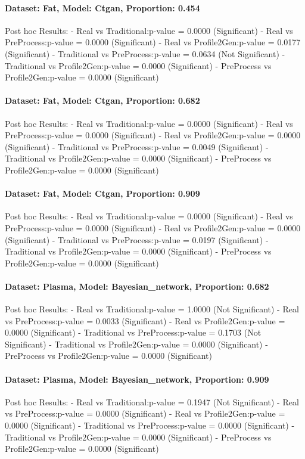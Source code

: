 \documentclass{article}
\theoremstyle{plain}
\theoremstyle{definition}
\theoremstyle{remark}
\begin{document}
\paragraph{Dataset: Fat, Model: Ctgan, Proportion: 0.454
}Post hoc Results:
- Real vs Traditional:p-value = 0.0000 (Significant)
- Real vs PreProcess:p-value = 0.0000 (Significant)
- Real vs Profile2Gen:p-value = 0.0177 (Significant)
- Traditional vs PreProcess:p-value = 0.0634 (Not Significant)
- Traditional vs Profile2Gen:p-value = 0.0000 (Significant)
- PreProcess vs Profile2Gen:p-value = 0.0000 (Significant)

\paragraph{Dataset: Fat, Model: Ctgan, Proportion: 0.682
}Post hoc Results:
- Real vs Traditional:p-value = 0.0000 (Significant)
- Real vs PreProcess:p-value = 0.0000 (Significant)
- Real vs Profile2Gen:p-value = 0.0000 (Significant)
- Traditional vs PreProcess:p-value = 0.0049 (Significant)
- Traditional vs Profile2Gen:p-value = 0.0000 (Significant)
- PreProcess vs Profile2Gen:p-value = 0.0000 (Significant)

\paragraph{Dataset: Fat, Model: Ctgan, Proportion: 0.909
}Post hoc Results:
- Real vs Traditional:p-value = 0.0000 (Significant)
- Real vs PreProcess:p-value = 0.0000 (Significant)
- Real vs Profile2Gen:p-value = 0.0000 (Significant)
- Traditional vs PreProcess:p-value = 0.0197 (Significant)
- Traditional vs Profile2Gen:p-value = 0.0000 (Significant)
- PreProcess vs Profile2Gen:p-value = 0.0000 (Significant)

\paragraph{Dataset: Plasma, Model: Bayesian\_network, Proportion: 0.682
}Post hoc Results:
- Real vs Traditional:p-value = 1.0000 (Not Significant)
- Real vs PreProcess:p-value = 0.0033 (Significant)
- Real vs Profile2Gen:p-value = 0.0000 (Significant)
- Traditional vs PreProcess:p-value = 0.1703 (Not Significant)
- Traditional vs Profile2Gen:p-value = 0.0000 (Significant)
- PreProcess vs Profile2Gen:p-value = 0.0000 (Significant)

\paragraph{Dataset: Plasma, Model: Bayesian\_network, Proportion: 0.909
}Post hoc Results:
- Real vs Traditional:p-value = 0.1947 (Not Significant)
- Real vs PreProcess:p-value = 0.0000 (Significant)
- Real vs Profile2Gen:p-value = 0.0000 (Significant)
- Traditional vs PreProcess:p-value = 0.0000 (Significant)
- Traditional vs Profile2Gen:p-value = 0.0000 (Significant)
- PreProcess vs Profile2Gen:p-value = 0.0000 (Significant)
\end{document}

